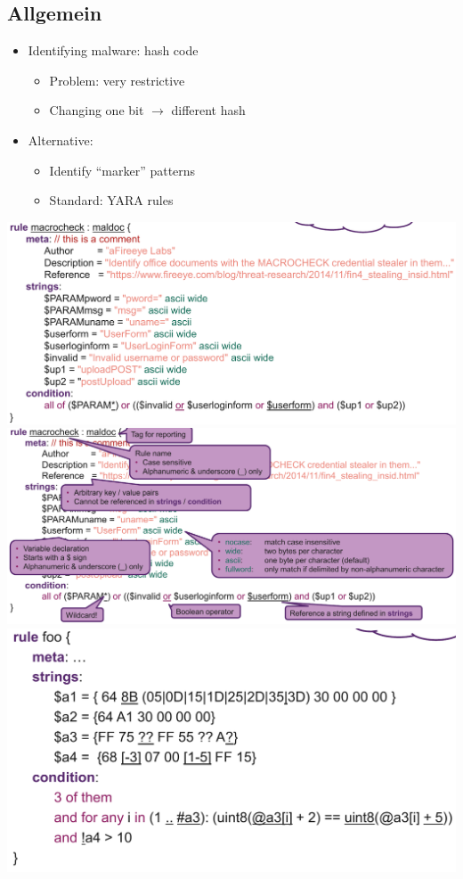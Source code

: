 \subsection{Allgemein}
\begin{itemize}
    \item Identifying malware: hash code
    \begin{itemize}
        \item Problem: very restrictive
        \item Changing one bit $\rightarrow$ different hash
    \end{itemize}
    \item Alternative:
    \begin{itemize}
        \item Identify “marker” patterns
        \item Standard: YARA rules
    \end{itemize}    
\end{itemize}
\includegraphics[width=\linewidth]{./img/12-yara/yara_rule.png}
\includegraphics[width=\linewidth]{./img/12-yara/yara_rule_explained.png}
\includegraphics[width=\linewidth]{./img/12-yara/yara_rule2.png}
